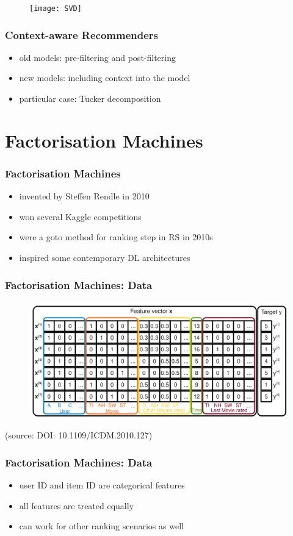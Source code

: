 \documentclass{beamer}
\begin{document}
\begin{frame}
  \begin{figure}
  \texttt{[image: SVD]}
  \end{figure}
\end{frame}
\begin{frame}
  \frametitle{Context-aware Recommenders}
  \begin{itemize}
  \item old models: pre-filtering and post-filtering
  \item new models: including context into the model
  \item particular case: Tucker decomposition
  \end{itemize}
\end{frame}
\section{Factorisation Machines}
\begin{frame}
  \frametitle{Factorisation Machines}
  \begin{itemize}
  \item invented by Steffen Rendle in 2010
  \item won several Kaggle competitions
  \item were a goto method for ranking step in RS in 2010s
  \item inspired some contemporary DL architectures
  \end{itemize}
\end{frame}
\begin{frame}
  \frametitle{Factorisation Machines: Data}
  \begin{figure}
    \includegraphics[scale=0.17]{fm}
  \end{figure}
  (source: DOI: 10.1109/ICDM.2010.127)
\end{frame}
\begin{frame}
  \frametitle{Factorisation Machines: Data}
  \begin{itemize}
  \item user ID and item ID are categorical features
  \item all features are treated equally
  \item can work for other ranking scenarios as well
  \end{itemize}
\end{frame}
\end{document}
